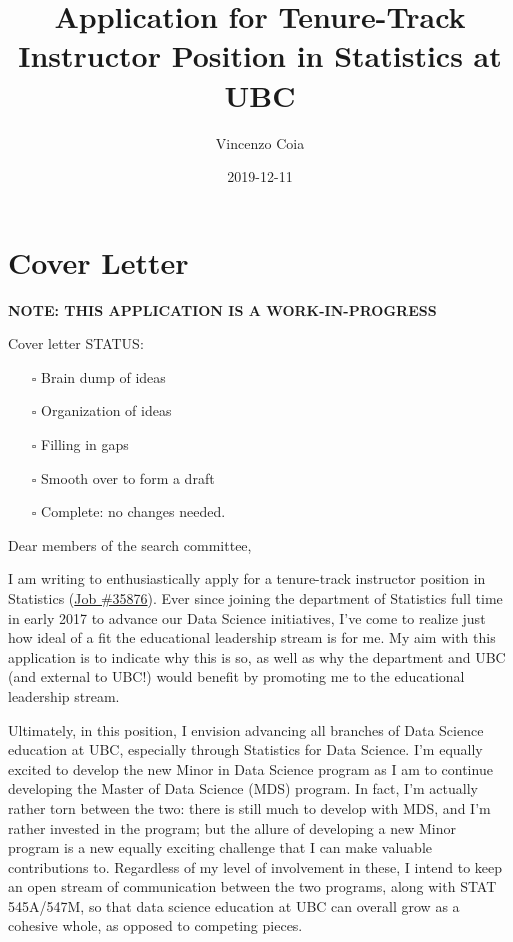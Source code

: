 \documentclass[]{article}
\title{Application for Tenure-Track Instructor Position in Statistics at UBC}
\author{Vincenzo Coia}
\date{2019-12-11}
\providecommand{\tightlist}{%
  \setlength{\itemsep}{0pt}\setlength{\parskip}{0pt}}
\begin{document}
\maketitle

{
\hypersetup{linkcolor=black}
\setcounter{tocdepth}{2}
\tableofcontents
}
\hypertarget{cover-letter}{%
\section{Cover Letter}\label{cover-letter}}

\textbf{NOTE: THIS APPLICATION IS A WORK-IN-PROGRESS}

Cover letter STATUS:

\begin{itemize}
\tightlist
\item[$\square$]
  Brain dump of ideas
\item[$\square$]
  Organization of ideas
\item[$\square$]
  Filling in gaps
\item[$\square$]
  Smooth over to form a draft
\item[$\square$]
  Complete: no changes needed.
\end{itemize}

Dear members of the search committee,

I am writing to enthusiastically apply for a tenure-track instructor position in Statistics (\href{https://www.stat.ubc.ca/three-tenure-track-instructor-positions-statistics-35876}{Job \#35876}). Ever since joining the department of Statistics full time in early 2017 to advance our Data Science initiatives, I've come to realize just how ideal of a fit the educational leadership stream is for me. My aim with this application is to indicate why this is so, as well as why the department and UBC (and external to UBC!) would benefit by promoting me to the educational leadership stream.

Ultimately, in this position, I envision advancing all branches of Data Science education at UBC, especially through Statistics for Data Science. I'm equally excited to develop the new Minor in Data Science program as I am to continue developing the Master of Data Science (MDS) program. In fact, I'm actually rather torn between the two: there is still much to develop with MDS, and I'm rather invested in the program; but the allure of developing a new Minor program is a new equally exciting challenge that I can make valuable contributions to. Regardless of my level of involvement in these, I intend to keep an open stream of communication between the two programs, along with STAT 545A/547M, so that data science education at UBC can overall grow as a cohesive whole, as opposed to competing pieces.
\end{document}
